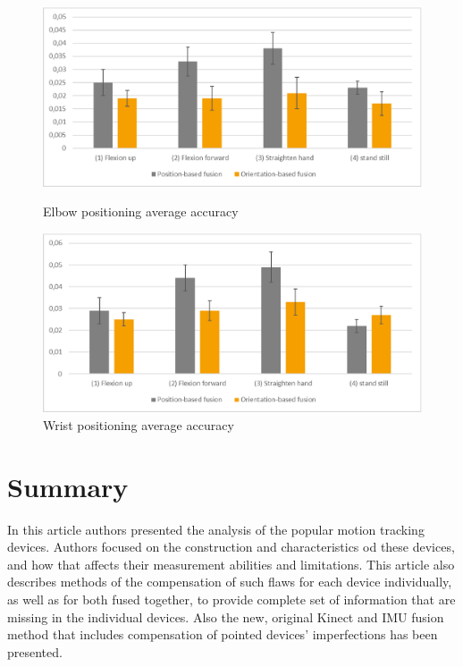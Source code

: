 \documentclass{llncs}
\begin{document}
\begin{figure}[h!]
	\centering
	\begin{minipage}[b]{0.49\linewidth}
		\centering   
		\includegraphics[width=\textwidth]{images/Fig13.eps}
		\caption{Elbow positioning average accuracy}
		\label{fig:positionElbow}
	\end{minipage}
	\begin{minipage}[b]{0.49\linewidth}
		\centering 
		\includegraphics[width=\textwidth]{images/Fig14.eps}
		\caption{Wrist positioning average accuracy}
		\label{fig:positionWrist}
	\end{minipage}
			
\end{figure}
		
\section{Summary}
In this article authors presented the analysis of the popular motion tracking devices. Authors focused on the construction and characteristics od these devices, and how that affects their measurement abilities and limitations. This article also describes methods of the compensation of such flaws for each device individually, as well as for both fused together, to provide complete set of information that are missing in the individual devices. Also the new,  original Kinect and IMU fusion method that includes compensation of pointed devices' imperfections has been presented.
\end{document}

